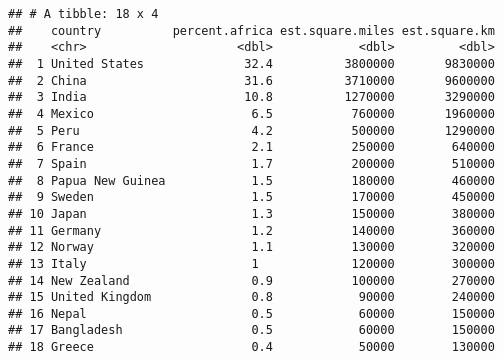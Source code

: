 \documentclass[
]{article}
\newenvironment{Shaded}{\begin{snugshade}}{\end{snugshade}}
\newcommand{\AttributeTok}[1]{\textcolor[rgb]{0.13,0.29,0.53}{#1}}
\newcommand{\CommentTok}[1]{\textcolor[rgb]{0.56,0.35,0.01}{\textit{#1}}}
\newcommand{\DecValTok}[1]{\textcolor[rgb]{0.00,0.00,0.81}{#1}}
\newcommand{\FunctionTok}[1]{\textcolor[rgb]{0.13,0.29,0.53}{\textbf{#1}}}
\newcommand{\NormalTok}[1]{#1}
\newcommand{\SpecialCharTok}[1]{\textcolor[rgb]{0.81,0.36,0.00}{\textbf{#1}}}
\begin{document}
\begin{verbatim}
## # A tibble: 18 x 4
##    country          percent.africa est.square.miles est.square.km
##    <chr>                     <dbl>            <dbl>         <dbl>
##  1 United States              32.4          3800000       9830000
##  2 China                      31.6          3710000       9600000
##  3 India                      10.8          1270000       3290000
##  4 Mexico                      6.5           760000       1960000
##  5 Peru                        4.2           500000       1290000
##  6 France                      2.1           250000        640000
##  7 Spain                       1.7           200000        510000
##  8 Papua New Guinea            1.5           180000        460000
##  9 Sweden                      1.5           170000        450000
## 10 Japan                       1.3           150000        380000
## 11 Germany                     1.2           140000        360000
## 12 Norway                      1.1           130000        320000
## 13 Italy                       1             120000        300000
## 14 New Zealand                 0.9           100000        270000
## 15 United Kingdom              0.8            90000        240000
## 16 Nepal                       0.5            60000        150000
## 17 Bangladesh                  0.5            60000        150000
## 18 Greece                      0.4            50000        130000
\end{verbatim}

\begin{Shaded}
\end{Shaded}
\end{document}
